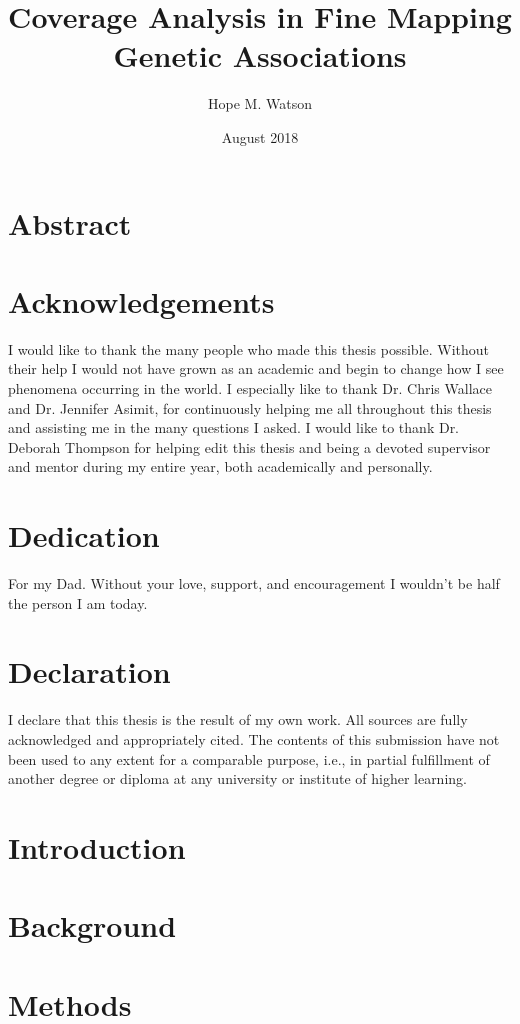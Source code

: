 \documentclass[12pt,twoside]{report}
\title{Coverage Analysis in Fine Mapping Genetic Associations}
\author{Hope M. Watson }
\date{August 2018}
\begin{document}


\chapter*{Abstract}


\chapter*{Acknowledgements}
I would like to thank the many people who made this thesis possible. Without their help I would not have grown as an academic and begin to change how I see phenomena occurring in the world. I especially like to thank Dr. Chris Wallace and Dr. Jennifer Asimit, for continuously helping me all throughout this thesis and assisting me in the many questions I asked. I would like to thank Dr. Deborah Thompson for helping edit this thesis and being a devoted supervisor and mentor during my entire year, both academically and personally. 
\chapter*{Dedication}
For my Dad. Without your love, support, and encouragement I wouldn't be half the person I am today.

\chapter*{Declaration}
I declare that this thesis is the result of my own work. All sources are fully acknowledged and
appropriately cited. The contents of this submission have not been used to any extent for a comparable
purpose, i.e., in partial fulfillment of another degree or diploma at any university or institute of
higher learning.

\tableofcontents 
\listoffigures

\chapter{Introduction}


\chapter{Background}


\chapter{Methods}

\end{document}
